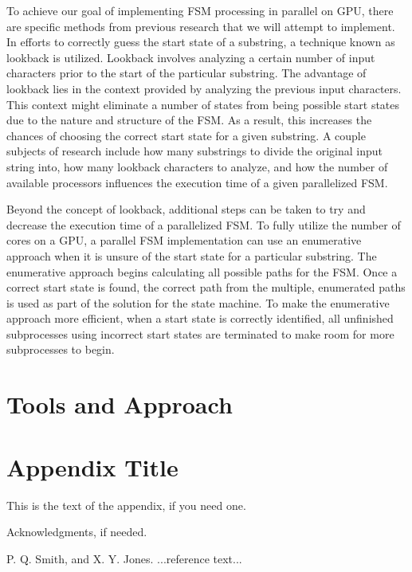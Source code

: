 \documentclass{sigplanconf}
\begin{document}
To achieve our goal of implementing FSM processing in parallel on GPU, there are specific methods from previous research that we will attempt to implement. In efforts to correctly guess the start state of a substring, a technique known as lookback is utilized. Lookback involves analyzing a certain number of input characters prior to the start of the particular substring. The advantage of lookback lies in the context provided by analyzing the previous input characters. This context might eliminate a number of states from being possible start states due to the nature and structure of the FSM. As a result, this increases the chances of choosing the correct start state for a given substring. A couple subjects of research include how many substrings to divide the original input string into, how many lookback characters to analyze, and how the number of available processors influences the execution time of a given parallelized FSM.

Beyond the concept of lookback, additional steps can be taken to try and decrease the execution time of a parallelized FSM. To fully utilize the number of cores on a GPU, a parallel FSM implementation can use an enumerative approach when it is unsure of the start state for a particular substring. The enumerative approach begins calculating all possible paths for the FSM. Once a correct start state is found, the correct path from the multiple, enumerated paths is used as part of the solution for the state machine. To make the enumerative approach more efficient, when a start state is correctly identified, all unfinished subprocesses using incorrect start states are terminated to make room for more subprocesses to begin.

\section{Tools and Approach}

\appendix
\section{Appendix Title}

This is the text of the appendix, if you need one.

\acks

Acknowledgments, if needed.





\begin{thebibliography}{}
\softraggedright

P. Q. Smith, and X. Y. Jones. ...reference text...

\end{thebibliography}
\end{document}
